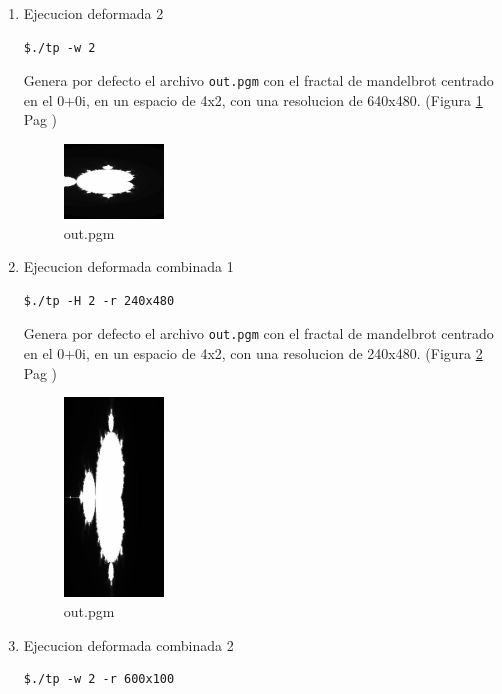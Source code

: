\documentclass[10pt,spanish,a4paper,openany,notitlepage]{article}
\begin{document}
\begin{enumerate}
\item Ejecucion deformada 2
\begin{framed}
\begin{verbatim}$./tp -w 2\end{verbatim}
\end{framed}

Genera por defecto el archivo \texttt{out.pgm} con el fractal de mandelbrot centrado en el 0+0i, en un espacio de 4x2, con una resolucion de 640x480. (Figura \ref{test6} Pag \pageref{test6})

\begin{figure}[hbt]
\centering
\includegraphics[width=0.25\textwidth]{out6.jpg}
\caption{out.pgm}
\label{test6}
\end{figure}


\item Ejecucion deformada combinada 1
\begin{framed}
\begin{verbatim}$./tp -H 2 -r 240x480\end{verbatim}
\end{framed}

Genera por defecto el archivo \texttt{out.pgm} con el fractal de mandelbrot centrado en el 0+0i, en un espacio de 4x2, con una resolucion de 240x480. (Figura \ref{test7} Pag \pageref{test7})

\begin{figure}[hbt]
\centering
\includegraphics[width=0.25\textwidth]{out7.jpg}
\caption{out.pgm}
\label{test7}
\end{figure}

\item Ejecucion deformada combinada 2
\begin{framed}
\begin{verbatim}$./tp -w 2 -r 600x100\end{verbatim}
\end{framed}


\end{enumerate}
\end{document}
